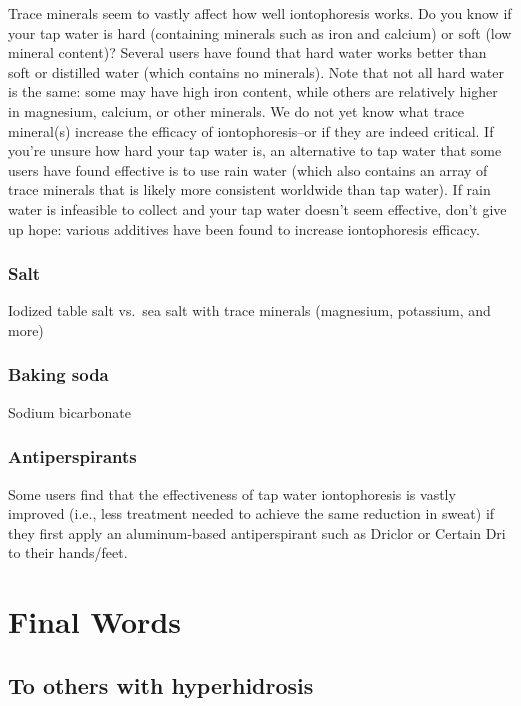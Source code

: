 \documentclass[]{book}
\begin{document}
Trace minerals seem to vastly affect how well iontophoresis works.
Do you know if your tap water is hard (containing minerals such as iron and calcium) or soft (low mineral content)?
Several users have found that hard water works better than soft or distilled water (which contains no minerals).
Note that not all hard water is the same: some may have high iron content, while others are relatively higher in magnesium, calcium, or other minerals.
We do not yet know what trace mineral(s) increase the efficacy of iontophoresis--or if they are indeed critical.
If you're unsure how hard your tap water is, an alternative to tap water that some users have found effective is to use rain water (which also contains an array of trace minerals that is likely more consistent worldwide than tap water).
If rain water is infeasible to collect and your tap water doesn't seem effective, don't give up hope: various additives have been found to increase iontophoresis efficacy.

\hypertarget{salt}{%
\subsection{Salt}\label{salt}}

Iodized table salt vs.~sea salt with trace minerals (magnesium, potassium, and more)

\hypertarget{baking-soda}{%
\subsection{Baking soda}\label{baking-soda}}

Sodium bicarbonate

\hypertarget{antiperspirants}{%
\subsection{Antiperspirants}\label{antiperspirants}}

Some users find that the effectiveness of tap water iontophoresis is vastly improved (i.e., less treatment needed to achieve the same reduction in sweat) if they first apply an aluminum-based antiperspirant such as Driclor or Certain Dri to their hands/feet.

\hypertarget{final-words}{%
\chapter{Final Words}\label{final-words}}

\hypertarget{to-others-with-hyperhidrosis}{%
\section{To others with hyperhidrosis}\label{to-others-with-hyperhidrosis}}
\end{document}
